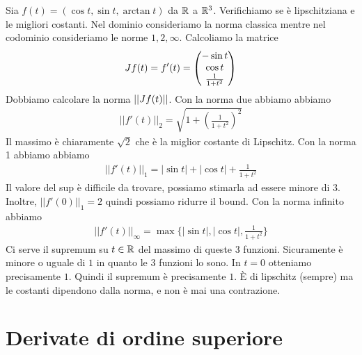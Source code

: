 \documentclass[a4paper]{article}
\begin{document}
\begin{radioactive}
\begin{snippetexample}{}
    Sia \(f(t) = (\cos t, \sin t, \arctan t)\) da \(\mathbb{R}\) a \(\mathbb{R}^3\).
    Verifichiamo se è lipschitziana e le migliori costanti.
    Nel dominio consideriamo la norma classica mentre nel codominio consideriamo
    le norme \(1,2, \infty\).
    Calcoliamo la matrice
    \[
        J f(t) = f'(t) = \begin{pmatrix}
            -\sin t \\
            \cos t \\
            \frac{1}{1 + t^2}
        \end{pmatrix}
    \]
    Dobbiamo calcolare la norma \(||J f(t)||\).
    Con la norma due abbiamo
    abbiamo \begin{align*}
        ||f'(t)||_2 = \sqrt{1 + {\left(\frac{1}{1 + t^2}\right)}^2} 
    \end{align*}
    Il massimo è chiaramente \(\sqrt{2}\) che è la miglior costante di Lipschitz.
    Con la norma 1 abbiamo
    abbiamo \begin{align*}
        ||f'(t)||_1 = |\sin t| + |\cos t| + \frac{1}{1 + t^2}
    \end{align*}
    Il valore del sup è difficile da trovare, possiamo stimarla ad essere
    minore di \(3\). Inoltre, \(||f'(0)||_1 = 2\)
    quindi possiamo ridurre il bound.
    Con la norma infinito abbiamo
    \begin{align*}
        ||f'(t)||_\infty = \max\{|\sin t|, |\cos t|, \frac{1}{1 + t^2}\}
    \end{align*}
    Ci serve il supremum su \(t \in \mathbb{R}\)
    del massimo di queste 3 funzioni. Sicuramente è minore o uguale di \(1\)
    in quanto le 3 funzioni lo sono. In \(t=0\)
    otteniamo precisamente \(1\).
    Quindi il supremum è precisamente \(1\).
    È di lipschitz (sempre) ma le costanti dipendono dalla norma, e non è mai
    una contrazione.
\end{snippetexample}
\end{radioactive}


\pagebreak


\section{Derivate di ordine superiore}
\end{document}
